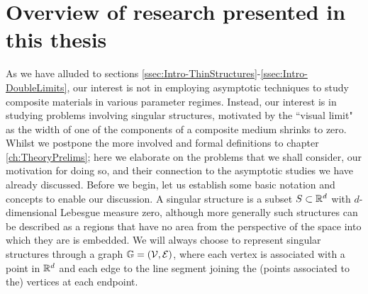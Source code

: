 \section{Overview of research presented in this thesis} \label{sec:Intro-ProblemIntroduction}
As we have alluded to sections \ref{ssec:Intro-ThinStructures}-\ref{ssec:Intro-DoubleLimits}, our interest is not in employing asymptotic techniques to study composite materials in various parameter regimes.
Instead, our interest is in studying problems involving singular structures, motivated by the ``visual limit" as the width of one of the components of a composite medium shrinks to zero.
Whilst we postpone the more involved and formal definitions to chapter \ref{ch:TheoryPrelims}; here we elaborate on the problems that we shall consider, our motivation for doing so, and their connection to the asymptotic studies we have already discussed.
Before we begin, let us establish some basic notation and concepts to enable our discussion.
A singular structure is a subset $S\subset\mathbb{R}^d$ with $d$-dimensional Lebesgue measure zero, although more generally such structures can be described as a regions that have no area from the perspective of the space into which they are is embedded.
We will always choose to represent singular structures through a graph $\mathbb{G}=\left( \mathcal{V},\mathcal{E} \right)$, where each vertex is associated with a point in $\mathbb{R}^d$ and each edge to the line segment joining the (points associated to the) vertices at each endpoint.

